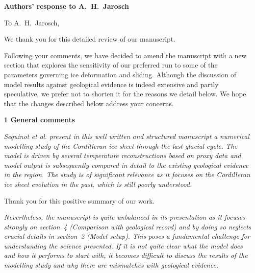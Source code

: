 


\textbf{Authors' response to A.~H.~Jarosch}
\bigskip


\newcommand{\sechead}[1]{\bigskip\noindent\textbf{#1}}
\newcommand{\referee}[1]{\bigskip\textcolor{journalname}{\textit{#1}}}
\newcommand{\msquote}[1]{\begin{quote}\textit{#1}\end{quote}}

To A.~H.~Jarosch,

We thank you for this detailed review of our manuscript.

Following your comments, we have decided to amend the manuscript with a new
section that explores the sensitivity of our preferred run to some of the
parameters governing ice deformation and sliding. Although the discussion of
model results against geological evidence is indeed extensive and partly
speculative, we prefer not to shorten it for the reasons we detail below.
We hope that the changes described below address your concerns.


\sechead{1 \quad General comments}

\referee{%
    Seguinot et al. present in this well written and structured manuscript a
    numerical modelling study of the Cordilleran ice sheet through the last
    glacial cycle. The model is driven by several temperature reconstructions
    based on proxy data and model output is subsequently compared in detail to
    the existing geological evidence in the region. The study is of significant
    relevance as it focuses on the Cordilleran ice sheet evolution in the past,
    which is still poorly understood.}

Thank you for this positive summary of our work.

\referee{%
    Nevertheless, the manuscript is quite unbalanced in its presentation as it
    focuses strongly on section~4 (Comparison with geological record) and by
    doing so neglects crucial details in section~2 (Model setup). This poses a
    fundamental challenge for understanding the science presented. If it is not
    quite clear what the model does and how it performs to start with, it
    becomes difficult to discuss the results of the modelling study and why
    there are mismatches with geological evidence.}

